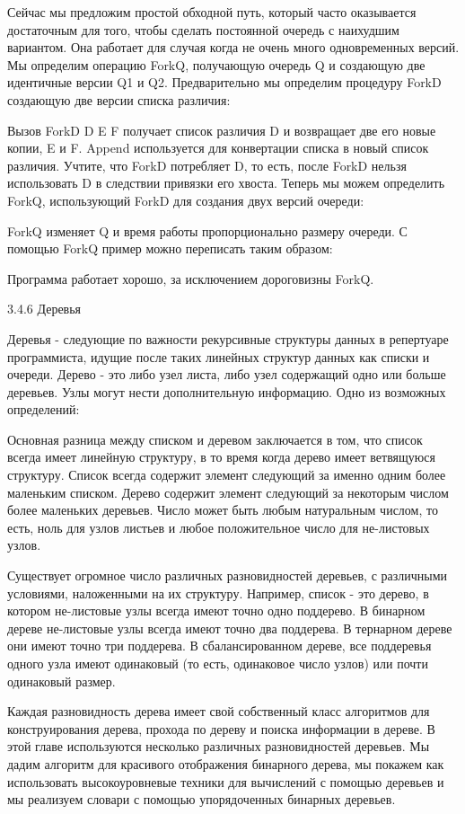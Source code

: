 Сейчас мы предложим простой обходной путь, который часто оказывается достаточным для того, чтобы сделать постоянной очередь с наихудшим вариантом. Она работает для случая когда не очень много одновременных версий. Мы определим операцию ForkQ, получающую очередь Q и создающую две идентичные версии Q1 и Q2. Предварительно мы определим процедуру ForkD создающую две версии списка различия:

Вызов {ForkD D E F} получает список различия D и возвращает две его новые копии, E и F. Append используется для конвертации списка в новый список различия. Учтите, что ForkD потребляет D, то есть, после ForkD нельзя использовать D в следствии привязки его хвоста. Теперь мы можем определить ForkQ, использующий ForkD для создания двух версий очереди:

ForkQ изменяет Q и время работы пропорционально размеру очереди. С помощью ForkQ пример можно переписать таким образом:

Программа работает хорошо, за исключением дороговизны ForkQ.

3.4.6 Деревья

Деревья - следующие по важности рекурсивные структуры данных в репертуаре программиста, идущие после таких линейных структур данных как списки и очереди. Дерево - это либо узел листа, либо узел содержащий одно или больше деревьев. Узлы могут нести дополнительную информацию. Одно из возможных определений:

Основная разница между списком и деревом заключается в том, что список всегда имеет линейную структуру, в то время когда дерево имеет ветвящуюся структуру. Список всегда содержит элемент следующий за именно одним более маленьким списком. Дерево содержит элемент следующий за некоторым числом более маленьких деревьев. Число может быть любым натуральным числом, то есть, ноль для узлов листьев и любое положительное число для не-листовых узлов.

Существует огромное число различных разновидностей деревьев, с различными условиями, наложенными на их структуру. Например, список - это дерево, в котором не-листовые узлы всегда имеют точно одно поддерево. В бинарном дереве не-листовые узлы всегда имеют точно два поддерева. В тернарном дереве они имеют точно три поддерева. В сбалансированном дереве, все поддеревья одного узла имеют одинаковый (то есть, одинаковое число узлов) или почти одинаковый размер.

Каждая разновидность дерева имеет свой собственный класс алгоритмов для конструирования дерева, прохода по дереву и поиска информации в дереве. В этой главе используются несколько различных разновидностей деревьев. Мы дадим алгоритм для красивого отображения бинарного дерева, мы покажем как использовать высокоуровневые техники для вычислений с помощью деревьев и мы реализуем словари с помощью упорядоченных бинарных деревьев.

